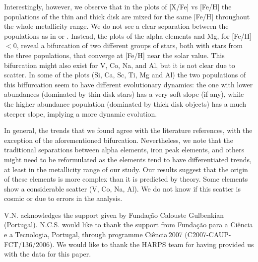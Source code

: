 \documentclass[oldversion]{aa}
\begin{document}
Interestingly, however, we observe that in the plots of [X/Fe] vs [Fe/H] the populations of the thin and thick disk are mixed for the same [Fe/H] throughout the whole metallicity range. We do not see a clear separation between the populations as in \citet{Fuhrmann-2004} or \citet{Bensby-2005}. Instead, the plots of the alpha elements and Mg, for [Fe/H] $<0$, reveal a bifurcation of two different groups of stars, both with stars from the three populations, that converge at [Fe/H] near the solar value. This bifurcation might also exist for V, Co, Na, and Al, but it is not clear due to scatter. In some of the plots (Si, Ca, Sc, Ti, Mg and Al) the two populations of this biffurcation seem to have different evolutionary dynamics: the one with lower abundances (dominated by thin disk stars) has a very soft slope (if any), while the higher abundance population (dominated by thick disk objects) has a much steeper slope, implying a more dynamic evolution. %

In general, the trends that we found agree with the literature references, with the exception of the aforementioned bifurcation. Nevertheless, we note that the traditional separations between alpha elements, iron peak elements, and others might need to be reformulated as the elements tend to have differentiated trends, at least in the metallicity range of our study. Our results suggest that the origin of these elements is more complex than it is predicted by theory. Some elements show a considerable scatter (V, Co, Na, Al). We do not know if this scatter is cosmic or due to errors in the analysis. %


\begin{acknowledgements}
%				      
V.N. acknowledges the support given by Funda\c{c}\~{a}o Calouste Gulbenkian (Portugal).
N.C.S. would like to thank the support from Funda\c{c}\~ao para a Ci\^encia 
e a Tecnologia, Portugal, through programme Ci\^encia\,2007
(C2007-CAUP-FCT/136/2006).
We would like to thank the HARPS team for having provided us with the data for this paper.
%
\end{acknowledgements}




\end{document}
